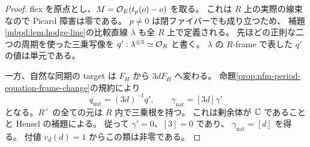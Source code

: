 \begin{proof}
flex を原点とし、$M=\mathcal O_E(t_p(o)-o)$ を取る。
これは $R$ 上の実際の線束なので Picard 障害は零である。
$p\ne0$ は閉ファイバーでも成り立つため、
補題\ref{mbpd:lem:hodge-line}の比較直線 $\lambda$ も全 $R$ 上で定義される。
先ほどの正則な二つの周期を使った三乗写像を
$q':\lambda^{\otimes3}\simeq\mathcal O_R$ と書く。
$\lambda$ の $R$-frame で表した $q'$ の値は単元である。

一方、自然な同期の target は $F_H$ から $3dF_H$ へ変わる。
命題\ref{prop:nfm-period-equation-frame-change}の規約により
\[
 q_{\mathrm{nat}}=(3d)^{-1}q',\qquad
 \gamma_{\mathrm{nat}}=[3d]\gamma'
\]
となる。$R^\times$ の全ての元は $R$ 内で三乗根を持つ。
これは剰余体が $\mathbb C$ であることと Hensel の補題による。
従って $\gamma'=0$、$[3]=0$ であり、
$\gamma_{\mathrm{nat}}=[d]$ を得る。
付値 $v_d(d)=1$ からこの類は非零である。
\end{proof}

